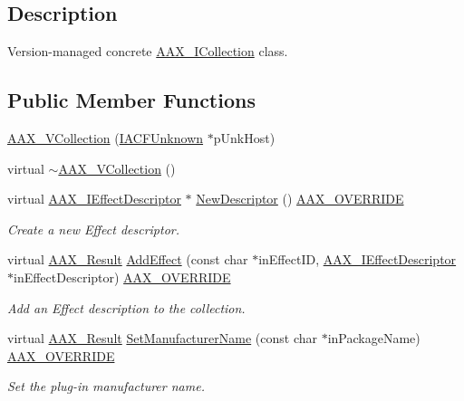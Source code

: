 \subsection{Description}
Version-\/managed concrete \hyperlink{a00087}{A\+A\+X\+\_\+\+I\+Collection} class. \subsection*{Public Member Functions}
\begin{DoxyCompactItemize}
\item 
\hyperlink{a00130_a68a62b3180bba5ede9b57402a241d8a5}{A\+A\+X\+\_\+\+V\+Collection} (\hyperlink{a00146}{I\+A\+C\+F\+Unknown} $\ast$p\+Unk\+Host)
\item 
virtual \hyperlink{a00130_a499715437f7f28e77046de417bd121be}{$\sim$\+A\+A\+X\+\_\+\+V\+Collection} ()
\item 
virtual \hyperlink{a00096}{A\+A\+X\+\_\+\+I\+Effect\+Descriptor} $\ast$ \hyperlink{a00130_adad9ce833210851c3aa92d2427ecb4f7}{New\+Descriptor} () \hyperlink{a00149_ac2f24a5172689ae684344abdcce55463}{A\+A\+X\+\_\+\+O\+V\+E\+R\+R\+I\+D\+E}
\begin{DoxyCompactList}\small\item\em Create a new Effect descriptor. \end{DoxyCompactList}\item 
virtual \hyperlink{a00149_a4d8f69a697df7f70c3a8e9b8ee130d2f}{A\+A\+X\+\_\+\+Result} \hyperlink{a00130_a19002849fe72624a49f7be47fdead471}{Add\+Effect} (const char $\ast$in\+Effect\+I\+D, \hyperlink{a00096}{A\+A\+X\+\_\+\+I\+Effect\+Descriptor} $\ast$in\+Effect\+Descriptor) \hyperlink{a00149_ac2f24a5172689ae684344abdcce55463}{A\+A\+X\+\_\+\+O\+V\+E\+R\+R\+I\+D\+E}
\begin{DoxyCompactList}\small\item\em Add an Effect description to the collection. \end{DoxyCompactList}\item 
virtual \hyperlink{a00149_a4d8f69a697df7f70c3a8e9b8ee130d2f}{A\+A\+X\+\_\+\+Result} \hyperlink{a00130_acbeb4c2c794a8518d6bf0bad720de922}{Set\+Manufacturer\+Name} (const char $\ast$in\+Package\+Name) \hyperlink{a00149_ac2f24a5172689ae684344abdcce55463}{A\+A\+X\+\_\+\+O\+V\+E\+R\+R\+I\+D\+E}
\begin{DoxyCompactList}\small\item\em Set the plug-\/in manufacturer name. \end{DoxyCompactList}\item 

\end{DoxyCompactItemize}
